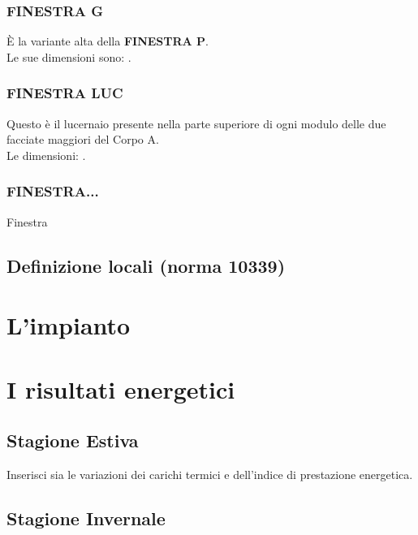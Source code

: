 \subsubsection{FINESTRA G}
È la variante alta della \textbf{FINESTRA P}. \\Le sue dimensioni sono: .
\subsubsection{FINESTRA LUC}
Questo è il lucernaio presente nella parte superiore di ogni modulo delle due facciate maggiori del Corpo A.\\ Le dimensioni: .
\subsubsection{FINESTRA...}
Finestra 
\subsection{Definizione locali (norma 10339)}
\section{L'impianto}
\section{I risultati energetici}
\subsection{Stagione Estiva}
Inserisci sia le variazioni dei carichi termici e dell'indice di prestazione energetica.
\subsection{Stagione Invernale}
